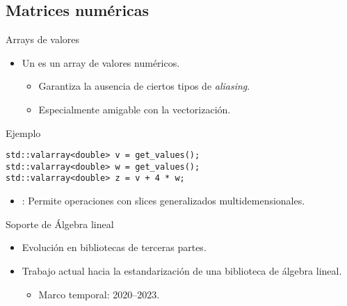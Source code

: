 \subsection{Matrices numéricas}

\begin{frame}[t,fragile]{Arrays de valores}
\begin{itemize}
  \item Un  es un array de valores numéricos.
    \begin{itemize}
      \item Garantiza la ausencia de ciertos tipos de \emph{aliasing}.
      \item Especialmente amigable con la vectorización.
    \end{itemize}
\end{itemize}
\pause
\begin{block}{Ejemplo}
\begin{lstlisting}
std::valarray<double> v = get_values();
std::valarray<double> w = get_values();
std::valarray<double> z = v + 4 * w;
\end{lstlisting}
\end{block}
\begin{itemize}
  \item {}: Permite operaciones con slices generalizados
        multidemensionales.
\end{itemize}
\end{frame}

\begin{frame}[t]{Soporte de Álgebra lineal}
\begin{itemize}
  \item Evolución en bibliotecas de terceras partes.
  \vspace{2em}
  \item Trabajo actual hacia la estandarización de una biblioteca de álgebra lineal.
    \begin{itemize}
      \item Marco temporal: 2020--2023.
    \end{itemize}
\end{itemize}
\end{frame}
